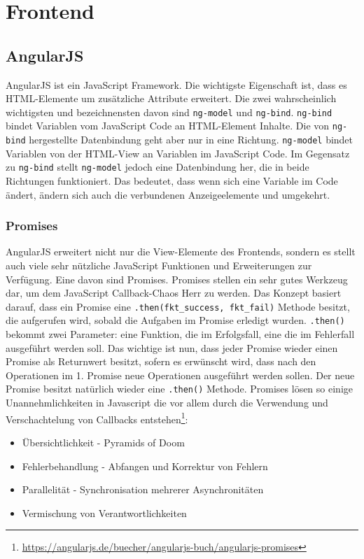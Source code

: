 \section{Frontend}

\subsection{AngularJS}

AngularJS ist ein JavaScript Framework. Die wichtigste Eigenschaft ist, dass es HTML-Elemente um zusätzliche Attribute erweitert. Die zwei wahrscheinlich wichtigsten und bezeichnensten davon sind \verb|ng-model| und \verb|ng-bind|. \verb|ng-bind| bindet Variablen vom JavaScript Code an HTML-Element Inhalte. Die von \verb|ng-bind| hergestellte Datenbindung geht aber nur in eine Richtung. \verb|ng-model| bindet Variablen von der HTML-View an Variablen im JavaScript Code. Im Gegensatz zu \verb|ng-bind| stellt \verb|ng-model| jedoch eine Datenbindung her, die in beide Richtungen funktioniert. Das bedeutet, dass wenn sich eine Variable im  Code ändert, ändern sich auch die verbundenen Anzeigeelemente und umgekehrt.

\subsubsection{Promises}
AngularJS erweitert nicht nur die View-Elemente des Frontends, sondern es stellt auch viele sehr nützliche JavaScript Funktionen und Erweiterungen zur Verfügung. Eine davon sind Promises. Promises stellen ein sehr gutes Werkzeug dar, um dem JavaScript Callback-Chaos Herr zu werden. Das Konzept basiert darauf, dass ein Promise eine \verb|.then(fkt_success, fkt_fail)| Methode besitzt, die aufgerufen wird, sobald die Aufgaben im Promise erledigt wurden. \verb|.then()| bekommt zwei Parameter: eine Funktion, die im Erfolgsfall, eine die im Fehlerfall ausgeführt werden soll. Das wichtige ist nun, dass jeder Promise wieder einen Promise als Returnwert besitzt, sofern es erwünscht wird, dass nach den Operationen im 1. Promise neue Operationen ausgeführt werden sollen. Der neue Promise besitzt natürlich wieder eine \verb|.then()| Methode. Promises lösen so einige Unannehmlichkeiten in Javascript die vor allem durch die Verwendung und Verschachtelung von Callbacks entstehen\footnote{\url{https://angularjs.de/buecher/angularjs-buch/angularjs-promises}}:

\begin{itemize}
	\item Übersichtlichkeit - Pyramids of Doom
	\item Fehlerbehandlung - Abfangen und Korrektur von Fehlern
	\item Parallelität - Synchronisation mehrerer Asynchronitäten
	\item Vermischung von Verantwortlichkeiten
\end{itemize}

